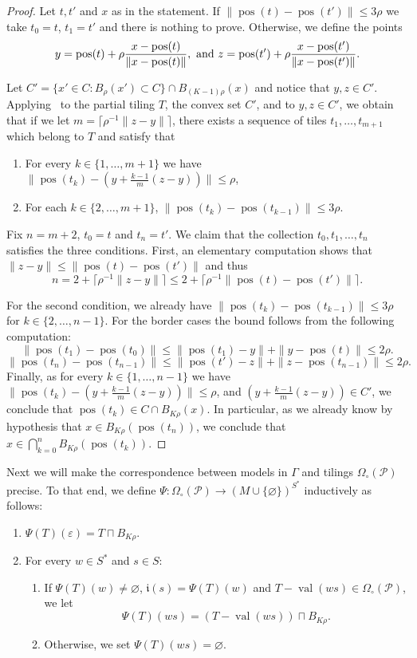 \documentclass{article}
\theoremstyle{definition}
\theoremstyle{definition}
\newcommand{\PP}{\mathcal{P}}
\newcommand{\init}{\mathfrak{i}}
\newcommand{\norm}[1]{\|{#1}\|}
\newcommand{\val}{\operatorname{val}}
\newcommand{\pos}{\operatorname{pos}}
\begin{document}
\begin{proof}
    Let $t,t'$ and $x$ as in the statement. If $\norm{\pos(t)-\pos(t')}\leq 3\rho$ we take $t_0 =t$, $t_1 = t'$ and there is nothing to prove. Otherwise, we define the points 
    $$y = \pos(t) + \rho\frac{x-\pos(t)}{\norm{x-\pos(t)}}, \ \textnormal{and} \ z = \pos(t') + \rho\frac{x-\pos(t')}{\norm{x-\pos(t')}}.$$
    
    Let $C' =  \{x' \in C : B_{\rho}(x')\subset C\} \cap B_{(K-1)\rho}(x)$ and notice that $y,z \in C'$. Applying~ to the partial tiling $T$, the convex set $C'$, and to $y,z\in C'$, we obtain that if we let $m = \lceil  \rho^{-1}\norm{z-y}\rceil$, there exists a sequence of tiles $t_1,\dots,t_{m+1}$ which belong to $T$ and satisfy that
    \begin{enumerate}
        \item For every $k \in \{1,\dots,m+1\}$ we have $\norm{\pos(t_k)- (y +\frac{k-1}{m}(z-y))}\leq \rho$,
        \item For each $k \in \{2,\dots,m+1\}$, $\norm{\pos(t_k)-\pos(t_{k-1})}\leq 3\rho$.
    \end{enumerate}
    
    Fix $n = m+2$, $t_0 =t$ and $t_n = t'$. We claim that the collection $t_0,t_1,\dots,t_n$ satisfies the three conditions. First, an elementary computation shows that $\norm{z-y}\leq \norm{\pos(t)-\pos(t')}$ and thus \[n = 2 + \lceil  \rho^{-1}\norm{z-y}\rceil \leq 2 +\lceil\rho^{-1}\norm{\pos(t)-\pos(t')}\rceil.\]

    For the second condition, we already have $\norm{\pos(t_k)-\pos(t_{k-1})}\leq 3\rho$ for $k \in \{2,\dots,n-1\}$. For the border cases the bound follows from the following computation:\[ \norm{\pos(t_1)-\pos(t_0)} \leq \norm{\pos(t_1)-y}+\norm{y-\pos(t)} \leq 2\rho.  \]
    \[ \norm{\pos(t_{n})-\pos(t_{n-1})} \leq \norm{\pos(t')-z}+\norm{z-\pos(t_{n-1})} \leq 2\rho.  \]
    Finally, as for every $k \in \{1,\dots,n-1\}$ we have $\norm{\pos(t_k)- (y +\frac{k-1}{m}(z-y))}\leq \rho$, and $(y +\frac{k-1}{m}(z-y))\in C'$, we conclude that $\pos(t_k)\in C \cap  B_{K\rho}(x)$. In particular, as we already know by hypothesis that $x \in B_{K\rho}(\pos(t_{n}))$, we conclude that $x\in \bigcap_{k=0}^n B_{K\rho}(\pos(t_{k}))$.\end{proof}

Next we will make the correspondence between models in $\Gamma$ and tilings $\Omega_\circ(\PP)$ precise. To that end, we define $\Psi \colon \Omega_\circ(\PP) \to (M \cup \{\varnothing \})^{S^*}$ inductively as follows:
\begin{enumerate}
    \item $\Psi(T)(\varepsilon) = T \sqcap B_{K\rho}$.
    \item For every $w \in S^*$ and $s \in S$:
    \begin{enumerate}
        \item If $\Psi(T)(w) \neq \varnothing$, $\init(s) = \Psi(T)(w)$ and $T-\val(ws) \in \Omega_\circ(\PP)$, we let \[\Psi(T)(ws) = (T-\val(ws))\sqcap B_{K\rho}.    \]
        \item Otherwise, we set $\Psi(T)(ws) = \varnothing$.
    \end{enumerate}
\end{enumerate}
\end{document}
